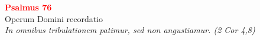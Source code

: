 


\def\greinitialformat#1{%
{\fontsize{39}{39}\selectfont #1}%
}




\vspace{0.3cm}
\begin{center}
 \textcolor{red}{\large \bf Psalmus 76}\\
Operum Domini recordatio\\
\textit{\small In omnibus tribulationem patimur, sed non angustiamur. (2 Cor 4,8)}
\end{center}
